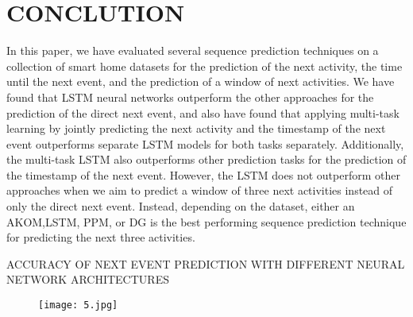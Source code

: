 \documentclass{article}
\begin{document}
\section{CONCLUTION}
        In this paper, we have evaluated several sequence prediction techniques on a collection of smart home datasets for the prediction of the next activity, the time until the next event, and the prediction of a window of next activities. We have found that LSTM neural networks outperform the other approaches for the prediction of the direct next event, and also have found that applying multi-task learning by jointly predicting the next activity and the timestamp of the next event outperforms separate LSTM models for both tasks separately. Additionally, the multi-task LSTM also outperforms other prediction tasks for the prediction of the timestamp of the next event. However, the LSTM does not outperform other approaches when we aim to predict a window of three next activities instead of only the direct next event. Instead, depending on the dataset, either an AKOM,LSTM, PPM, or DG is the best performing sequence prediction technique for predicting the next three activities.
\begin{table}[htbp]
    \centering
    \caption{ ACCURACY OF NEXT EVENT PREDICTION WITH DIFFERENT NEURAL NETWORK ARCHITECTURES}
    \label{tab:my_label}
\end{table}

\begin{figure}[h]
    \centering
    \texttt{[image: 5.jpg]}
    \label{fig:my_label}
\end{figure}
\end{document}
